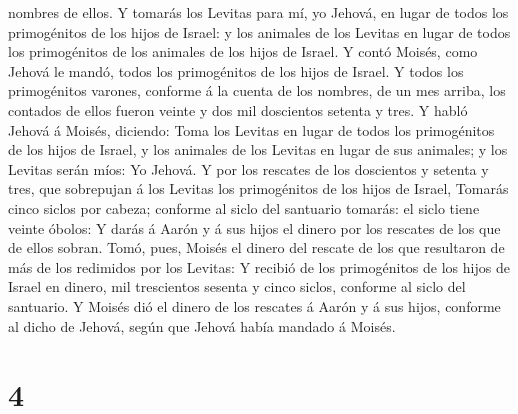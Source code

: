 nombres de ellos.  Y tomarás los Levitas para mí, yo
Jehová, en lugar de todos los primogénitos de los hijos de Israel: y los
animales de los Levitas en lugar de todos los primogénitos de los
animales de los hijos de Israel.  Y contó Moisés, como
Jehová le mandó, todos los primogénitos de los hijos de Israel.
 Y todos los primogénitos varones, conforme á la cuenta de
los nombres, de un mes arriba, los contados de ellos fueron veinte y dos
mil doscientos setenta y tres.  Y habló Jehová á Moisés,
diciendo:  Toma los Levitas en lugar de todos los
primogénitos de los hijos de Israel, y los animales de los Levitas en
lugar de sus animales; y los Levitas serán míos: Yo Jehová.
 Y por los rescates de los doscientos y setenta y tres, que
sobrepujan á los Levitas los primogénitos de los hijos de Israel,
 Tomarás cinco siclos por cabeza; conforme al siclo del
santuario tomarás: el siclo tiene veinte óbolos:  Y darás á
Aarón y á sus hijos el dinero por los rescates de los que de ellos
sobran.  Tomó, pues, Moisés el dinero del rescate de los
que resultaron de más de los redimidos por los Levitas:  Y
recibió de los primogénitos de los hijos de Israel en dinero, mil
trescientos sesenta y cinco siclos, conforme al siclo del santuario.
 Y Moisés dió el dinero de los rescates á Aarón y á sus
hijos, conforme al dicho de Jehová, según que Jehová había mandado á
Moisés.

\hypertarget{section-3}{%
\section{4}\label{section-3}}

